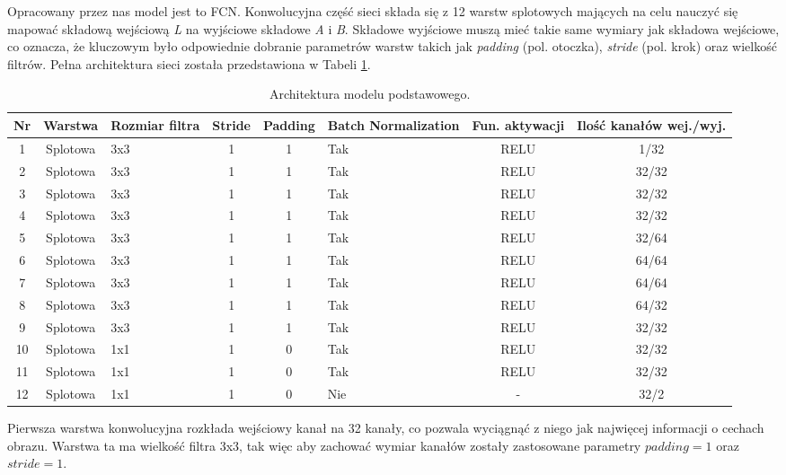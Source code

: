   Opracowany przez nas model jest to FCN. Konwolucyjna część sieci składa się
  z 12 warstw splotowych
  mających na celu nauczyć się mapować składową wejściową \textit{L} na wyjściowe
  składowe \textit{A} i \textit{B}. Składowe wyjściowe muszą mieć takie same
  wymiary jak składowa wejściowe, co oznacza, że kluczowym było odpowiednie dobranie
  parametrów warstw takich jak \textit{padding} (pol. otoczka), \textit{stride}
  (pol. krok) oraz wielkość filtrów. Pełna architektura sieci została przedstawiona w
  Tabeli \ref{table:model_architecture}.
  \noindent\begin{table}[h!]
    \center
    \begin{tabular}{|c | c | m{3.3em} | c | c | m{4em} | c | c| }
     \hline
     Nr & Warstwa & Rozmiar filtra & Stride & Padding & Batch Normalization &
     Fun. aktywacji & Ilość kanałów wej./wyj. \\ [0.5ex]
    \hline
    1 & Splotowa & 3x3 & 1 & 1 & Tak & RELU & 1/32 \\ \hline
    2 & Splotowa & 3x3 & 1 & 1 & Tak & RELU & 32/32 \\ \hline
    3 & Splotowa & 3x3 & 1 & 1 & Tak & RELU & 32/32 \\ \hline
    4 & Splotowa & 3x3 & 1 & 1 & Tak & RELU & 32/32 \\ \hline
    5 & Splotowa & 3x3 & 1 & 1 & Tak & RELU & 32/64 \\ \hline
    6 & Splotowa & 3x3 & 1 & 1 & Tak & RELU & 64/64 \\ \hline
    7 & Splotowa & 3x3 & 1 & 1 & Tak & RELU & 64/64 \\ \hline
    8 & Splotowa & 3x3 & 1 & 1 & Tak & RELU & 64/32 \\ \hline
    9 & Splotowa & 3x3 & 1 & 1 & Tak & RELU & 32/32 \\ \hline
    10 & Splotowa & 1x1 & 1 & 0 & Tak & RELU & 32/32 \\ \hline
    11 & Splotowa & 1x1 & 1 & 0 & Tak & RELU & 32/32 \\ \hline
    12 & Splotowa & 1x1 & 1 & 0 & Nie & - & 32/2 \\ \hline
    \end{tabular}
    \caption{Architektura modelu podstawowego.}
    \label{table:model_architecture}
  \end{table}
  Pierwsza warstwa konwolucyjna rozkłada wejściowy kanał na 32 kanały, co
  pozwala wyciągnąć z niego jak najwięcej informacji o cechach obrazu. Warstwa
  ta ma wielkość filtra 3x3, tak więc aby zachować wymiar kanałów zostały
  zastosowane parametry $\textit{padding}=1$ oraz $\textit{stride}=1$.

